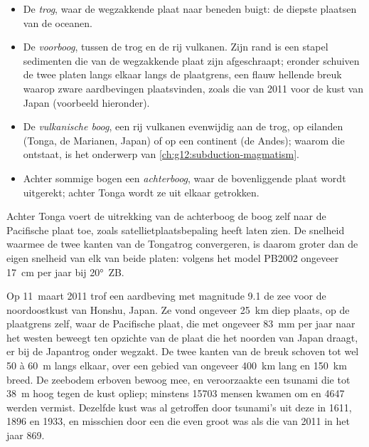 \begin{itemize}
  \item De \emph{trog}, waar de wegzakkende plaat naar beneden buigt: de diepste
        plaatsen van de oceanen.
  \item De \emph{voorboog}, tussen de trog en de rij vulkanen. Zijn
        rand is een stapel sedimenten die van de wegzakkende plaat zijn afgeschraapt; eronder
        schuiven de twee platen langs elkaar langs de plaatgrens, een
        flauw hellende breuk waarop zware aardbevingen plaatsvinden, zoals
        die van 2011 voor de kust van Japan (voorbeeld hieronder).
  \item De \emph{vulkanische boog}, een rij vulkanen evenwijdig aan de trog,
        op eilanden (Tonga, de Marianen, Japan) of op een continent (de Andes);
        waarom die ontstaat, is het onderwerp van \cref{ch:g12:subduction-magmatism}.
  \item Achter sommige bogen een \emph{achterboog}, waar de bovenliggende plaat wordt
        uitgerekt; achter Tonga wordt ze uit elkaar getrokken.
\end{itemize}

Achter Tonga voert de uitrekking van de achterboog de boog zelf naar de
Pacifische plaat toe, zoals satellietplaatsbepaling heeft laten zien. De snelheid waarmee de twee kanten van de Tongatrog convergeren,
is daarom groter dan de eigen snelheid van elk van beide platen: volgens het model PB2002
ongeveer \qty{17}{cm} per jaar bij \ang{20}~ZB.

\begin{example}\label{ex:g11:subduction-zones:tohoku}
Op 11~maart 2011 trof een aardbeving met magnitude 9.1 de zee voor de noordoostkust
van Honshu, Japan. Ze vond ongeveer \qty{25}{km} diep plaats, op de plaatgrens
zelf, waar de Pacifische plaat, die met ongeveer \qty{83}{mm} per
jaar naar het westen beweegt ten opzichte van de plaat die het noorden van Japan draagt, er bij
de Japantrog onder wegzakt. De twee kanten van de breuk schoven tot wel 50 à
\qty{60}{m} langs elkaar, over een gebied van ongeveer \qty{400}{km} lang en
\qty{150}{km} breed. De zeebodem erboven bewoog mee, en veroorzaakte een tsunami
die tot \qty{38}{m} hoog tegen de kust opliep; minstens \num{15703} mensen kwamen
om en \num{4647} werden vermist. Dezelfde kust was al getroffen door
tsunami's uit deze  in 1611, 1896 en 1933, en misschien door een
die even groot was als die van 2011 in het jaar 869.
\end{example}

